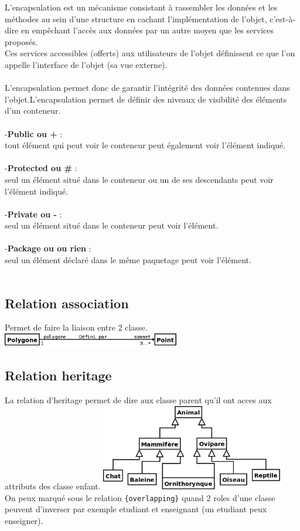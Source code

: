 \documentclass[a4paper,12pt,openany]{book}
\begin{document}
L'encapsulation est un mécanisme consistant à rassembler les données et les méthodes au sein d'une structure en cachant l'implémentation de l'objet, c'est-à-dire en empêchant l'accès aux données par un autre moyen que les services proposés.\\
Ces services accessibles (offerts) aux utilisateurs de l'objet définissent ce que l'on appelle l'interface de l'objet (sa vue externe).\\
\\
L'encapsulation permet donc de garantir l'intégrité des données contenues dans l'objet.L'encapsulation permet de définir des niveaux de visibilité des éléments d'un conteneur.\\
\\
-\textbf{Public ou + }:\\
tout élément qui peut voir le conteneur peut également voir l'élément indiqué.\\
\\
-\textbf{Protected ou \# }:\\
seul un élément situé dans le conteneur ou un de ses descendants peut voir l'élément indiqué.\\
\\
-\textbf{Private ou - }:\\
seul un élément situé dans le conteneur peut voir l'élément.\\
\\
-\textbf{Package ou \∼ ou rien} :\\
seul un élément déclaré dans le même paquetage peut voir l'élément.\\
\\

\subsection{Relation association}

Permet de faire la liaison entre 2 classe.\\
\includegraphics[width=0.60\textwidth,center]{img/relation_association.png}


\subsection{Relation heritage}

La relation d'heritage permet de dire aux classe parent qu'il ont acces aux attributs des classe enfant.
\includegraphics[width=0.60\textwidth,center]{img/relation_heritage.png}
\\
On peux marqu\'e sous le relation \verb+{overlapping}+ quand 2 roles d'une classe peuvent d'inverser par exemple etudiant et enseignant (un etudiant peux enseigner).
\end{document}
